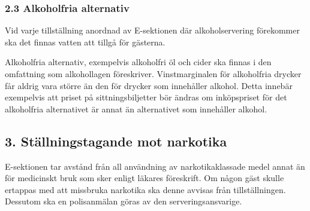 \documentclass[10pt]{article}
\begin{document}
\subsubsection*{2.3 Alkoholfria alternativ}
Vid varje tillställning anordnad av E-sektionen där alkoholservering förekommer ska det finnas vatten att tillgå för gästerna.

Alkoholfria alternativ, exempelvis alkoholfri öl och cider ska finnas i den omfattning som alkohollagen föreskriver. Vinstmarginalen för alkoholfria drycker får aldrig vara större än den för drycker som innehåller alkohol. Detta innebär exempelvis att priset på sittningsbiljetter bör ändras om inköpspriset för det alkoholfria alternativet är annat än alternativet som innehåller alkohol.

\subsection*{3. Ställningstagande mot narkotika}
E-sektionen tar avstånd från all användning av narkotikaklassade medel annat än för medicinskt bruk som sker enligt läkares föreskrift. Om någon gäst skulle ertappas med att missbruka narkotika ska denne avvisas från tillställningen. Dessutom ska en polisanmälan göras av den serveringsansvarige.
\end{document}
